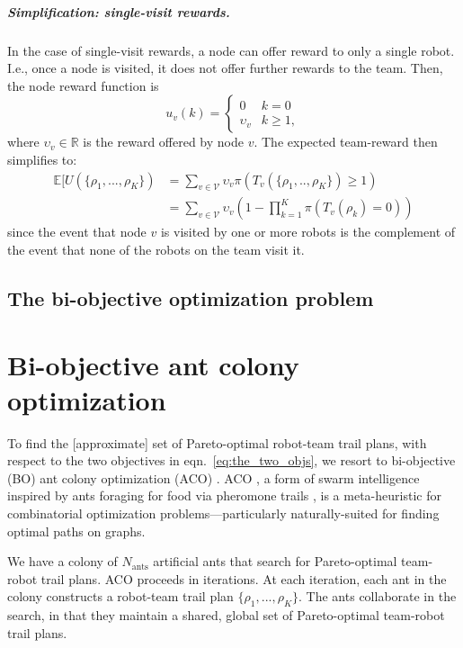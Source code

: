 \documentclass[11pt, oneside]{article}
\begin{document}
\vspace{-\baselineskip}
\subparagraph{Simplification: single-visit rewards.}
In the case of single-visit rewards, a node can offer reward to only a single robot. I.e., once a node is visited, it does not offer further rewards to the team. Then, the node reward function is
\begin{equation}
	u_v(k) = \begin{cases}
		0 & k = 0 \\
		\upsilon_v & k \geq 1,
	\end{cases}
\end{equation} where $\upsilon_v \in \mathbb{R}$ is the reward offered by node $v$. The expected team-reward then simplifies to:
\begin{align}
	\mathbb{E}[U(\{\rho_1, ..., \rho_K\}) & = \sum_{v \in \mathcal{V} } \upsilon_v \pi(T_v(\{\rho_1, .., \rho_K\}) \geq 1) \\
		      & = \sum_{v \in \mathcal{V} } \upsilon_v \left(1 - \prod_{k=1}^K  \pi(T_v(\rho_k) =0) \right) 
\end{align} since the event that node $v$ is visited by one or more robots is the complement of the event that none of the robots on the team visit it.


\subsection{The bi-objective optimization problem}





\section{Bi-objective ant colony optimization}
To find the [approximate] set of Pareto-optimal robot-team trail plans, with respect to the two objectives in eqn.~\ref{eq:the_two_objs}, we resort to bi-objective (BO) ant colony optimization (ACO) \cite{iredi2001bi}. 
ACO \cite{dorigo2006ant}, a form of swarm intelligence \cite{bonabeau1999swarm} inspired by ants foraging for food via pheromone trails \cite{bonabeau2000inspiration}, is a meta-heuristic for combinatorial optimization problems---particularly naturally-suited for finding optimal paths on graphs. 

We have a colony of $N_{\text{ants}}$ artificial ants that search for Pareto-optimal team-robot trail plans. 
ACO proceeds in iterations. 
At each iteration, each ant in the colony constructs a robot-team trail plan $\{\rho_1, ..., \rho_K\}$. 
The ants collaborate in the search, in that they maintain a shared, global set of Pareto-optimal team-robot trail plans.
\end{document}
